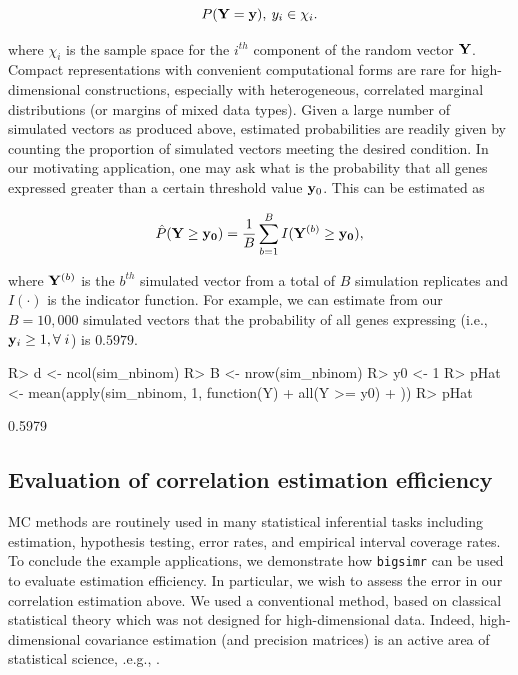 \documentclass[
]{jss}
\begin{document}
\[
P( {\bf Y} = {\bf y} ), \: y_i \in \chi_i.
\]

where \(\chi_i\) is the sample space for the \(i^{th}\) component of the random vector \(\bf{Y}\). Compact representations with convenient computational forms are rare for high-dimensional constructions, especially with heterogeneous, correlated marginal distributions (or margins of mixed data types). Given a large number of simulated vectors as produced above, estimated probabilities are readily given by counting the proportion of simulated vectors meeting the desired condition. In our motivating application, one may ask what is the probability that all genes expressed greater than a certain threshold value \({\bf y}_0\). This can be estimated as

\[
\hat{P}( {\bf Y} \ge {\bf y_0 } ) = \frac{1}{B} \sum_{b=1}^B I( {\bf Y}^{ (b) } \ge {\bf y_0} ),
\]

where \({\bf Y}^{(b)}\) is the \(b^{th}\) simulated vector from a total of \(B\) simulation replicates and \(I(\cdot)\) is the indicator function. For example, we can estimate from our \(B=10,000\) simulated vectors that the probability of all genes expressing (i.e., \({\bf y}_i \geq 1, \forall \; i\)) is \(0.5979\).

\begin{CodeChunk}
\begin{CodeInput}
R> d <- ncol(sim_nbinom)
R> B <- nrow(sim_nbinom)
R> y0 <- 1
R> pHat <- mean(apply(sim_nbinom, 1, function(Y) {
+   all(Y >= y0)
+ }))
R> pHat
\end{CodeInput}
\begin{CodeOutput}
[1] 0.5979
\end{CodeOutput}
\end{CodeChunk}

\hypertarget{evaluation-of-correlation-estimation-efficiency}{%
\subsection{Evaluation of correlation estimation efficiency}\label{evaluation-of-correlation-estimation-efficiency}}

MC methods are routinely used in many statistical inferential tasks including estimation, hypothesis testing, error rates, and empirical interval coverage rates. To conclude the example applications, we demonstrate how \texttt{bigsimr} can be used to evaluate estimation efficiency. In particular, we wish to assess the error in our correlation estimation above. We used a conventional method, based on classical statistical theory which was not designed for high-dimensional data. Indeed, high-dimensional covariance estimation (and precision matrices) is an active area of statistical science, .e.g., \citep{Won2013g, VanWieringen2016}.
\end{document}
